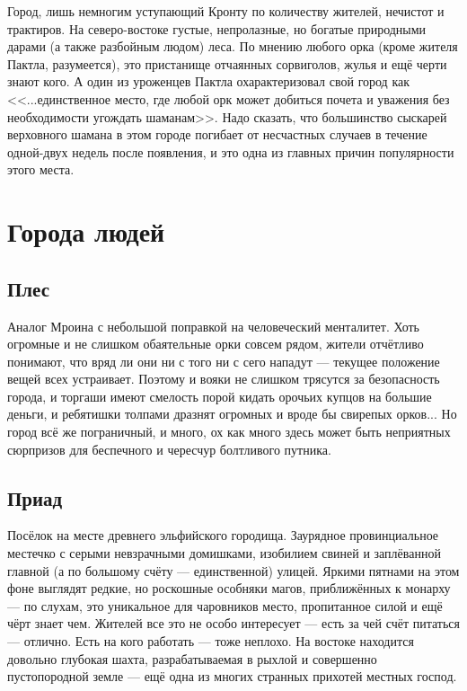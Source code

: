 \documentclass[12pt,a4paper]{book}
\begin{document}
Город, лишь немногим уступающий Кронту по количеству жителей, нечистот и трактиров. На северо-востоке густые, непролазные, но богатые природными дарами (а также разбойным людом) леса. По мнению любого орка (кроме жителя Пактла, разумеется), это пристанище отчаянных сорвиголов, жулья и ещё черти знают кого. А один из уроженцев Пактла охарактеризовал свой город как <<...единственное место, где любой орк может добиться почета и уважения без необходимости угождать шаманам>>. Надо сказать, что большинство сыскарей верховного шамана в этом городе погибает от несчастных случаев в течение одной-двух недель после появления, и это одна из главных причин популярности этого места.

\section{Города людей}

\subsection{Плес}

Аналог Мроина с небольшой поправкой на человеческий менталитет. Хоть огромные и не слишком обаятельные орки совсем рядом, жители отчётливо понимают, что вряд ли они ни с того ни с сего нападут --- текущее положение вещей всех устраивает. Поэтому и вояки не слишком трясутся за безопасность города, и торгаши имеют смелость порой кидать орочьих купцов на большие деньги, и ребятишки толпами дразнят огромных и вроде бы свирепых орков... Но город всё же пограничный, и много, ох как много здесь может быть неприятных сюрпризов для беспечного и чересчур болтливого путника.

\subsection{Приад}

Посёлок на месте древнего эльфийского городища. Заурядное провинциальное местечко с серыми невзрачными домишками, изобилием свиней и заплёванной главной (а по большому счёту --- единственной) улицей. Яркими пятнами на этом фоне выглядят редкие, но роскошные особняки магов, приближённых к монарху --- по слухам, это уникальное для чаровников место, пропитанное силой и ещё чёрт знает чем. Жителей все это не особо интересует --- есть за чей счёт питаться --- отлично. Есть на кого работать --- тоже неплохо. На востоке находится довольно глубокая шахта, разрабатываемая в рыхлой и совершенно пустопородной земле --- ещё одна из многих странных прихотей местных господ.
\end{document}
